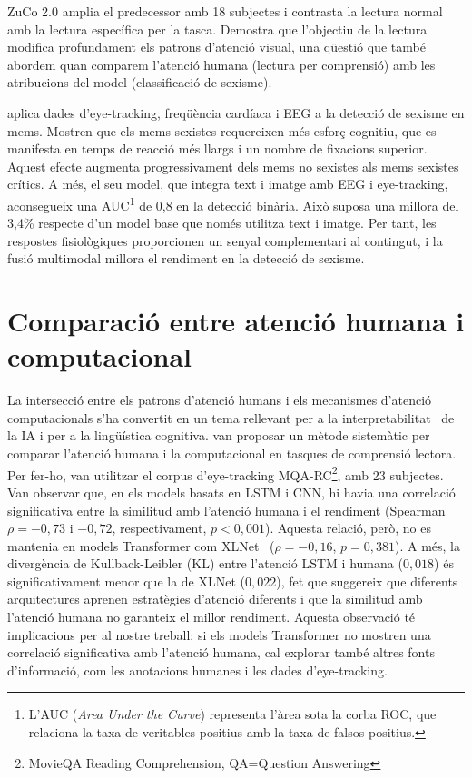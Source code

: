 ZuCo 2.0 \cite{hollenstein_zuco_2020} amplia el predecessor amb 18 subjectes i contrasta la lectura normal amb la lectura específica per la tasca. Demostra que l'objectiu de la lectura modifica profundament els patrons d'atenció visual, una qüestió que també abordem quan comparem l'atenció humana (lectura per comprensió) amb les atribucions del model (classificació de sexisme).

\textcite{arcosMultimodalSensorData2024} aplica dades d'eye-tracking, freqüència cardíaca i EEG a la detecció de sexisme en mems.
Mostren que els mems sexistes requereixen més esforç cognitiu, que es manifesta en temps de reacció més llargs i un nombre de fixacions superior. Aquest efecte augmenta progressivament dels mems no sexistes als mems sexistes crítics.
A més, el seu model, que integra text i imatge amb EEG i eye-tracking, aconsegueix una AUC\footnote{L'AUC (\textit{Area Under the Curve}) representa l'àrea sota la corba ROC, que relaciona la taxa de veritables positius amb la taxa de falsos positius.} de 0,8 en la detecció binària. Això suposa una millora del 3,4\% respecte d'un model base que només utilitza text i imatge.
Per tant, les respostes fisiològiques proporcionen un senyal complementari al contingut, i la fusió multimodal millora el rendiment en la detecció de sexisme.


\section{Comparació entre atenció humana i computacional}

La intersecció entre els patrons d'atenció humans i els mecanismes d'atenció computacionals s'ha convertit en un tema rellevant per a la interpretabilitat~\cite{lipton2018mythos} de la IA i per a la lingüística cognitiva.
\textcite{soodInterpretingAttentionModels2020} van proposar un mètode sistemàtic per comparar l'atenció humana i la computacional en tasques de comprensió lectora. Per fer-ho, van utilitzar el corpus d'eye-tracking MQA-RC\footnote{MovieQA Reading Comprehension, QA=Question Answering}, amb 23 subjectes.
Van observar que, en els models basats en LSTM i CNN, hi havia una correlació significativa entre la similitud amb l'atenció humana i el rendiment (Spearman $\rho = -0,73$ i $-0,72$, respectivament, $p < 0,001$). Aquesta relació, però, no es mantenia en models Transformer com XLNet~\cite{yang2019xlnet} ($\rho = -0,16$, $p = 0,381$).
A més, la divergència de Kullback-Leibler (KL) entre l'atenció LSTM i humana ($0,018$) és significativament menor que la de XLNet ($0,022$), fet que suggereix que diferents arquitectures aprenen estratègies d'atenció diferents i que la similitud amb l'atenció humana no garanteix el millor rendiment.
Aquesta observació té implicacions per al nostre treball: si els models Transformer no mostren una correlació significativa amb l'atenció humana, cal explorar també altres fonts d'informació, com les anotacions humanes i les dades d'eye-tracking.


